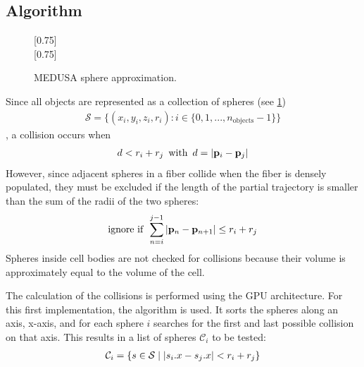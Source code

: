 \subsection{Algorithm}
%
\begin{figure}[!t]
    \centering
    \setlength{\tikzwidth}{0.75\textwidth}
    [0.75\textwidth]{}
    \\[2em]
    [0.75\textwidth]{}
    \caption{\ac{MEDUSA} sphere approximation.}
    \label{fig:medusaCell}
\end{figure}
%
Since all objects are represented as a collection of spheres (see \cref{fig:medusaCell})
\begin{align}
    \mathcal{S} = \{ (x_i,y_i,z_i,r_i) : i \in \{0, 1, ..., n_\text{objects}-1\}  \}
\end{align}
%
, a collision occurs when
%
\begin{align}
d<r_i+r_j \enspace \text{with} \enspace d = \lvert\mathbf{p}_i - \mathbf{p}_j\rvert
\end{align}
%
However, since adjacent spheres in a fiber collide when the fiber is densely populated, they must be excluded if the length of the partial trajectory is smaller than the sum of the radii of the two spheres:
\begin{align}
\text{ignore if} \enspace \sum_{n=i}^{j-1} \, \lvert\mathbf{p}_n - \mathbf{p}_{n+1}\rvert \leq  r_i + r_j 
\end{align}
%
Spheres inside cell bodies are not checked for collisions because their volume is approximately equal to the volume of the cell.
\par
%
The calculation of the collisions is performed using the GPU architecture.
For this first implementation, the algorithm  \cite{Karras2012} is used.
It sorts the spheres along an axis, \obda{} x-axis, and for each sphere $i$ searches for the first and last possible collision on that axis.
This results in a list of spheres $\mathcal{C}_i$ to be tested:
\begin{align}
\begin{split}
\mathcal{C}_i = \{ s \in \mathcal{S} \mid \lvert s_i.x - s_j.x\rvert < r_i+r_j \}
\end{split}
\end{align}
%
\begin{lstfloat}[!t]
	
	\caption{Pseudocode of \acs{MEDUSA}s collision checking.}
	\label{alg:medusa_collision}
\end{lstfloat}
